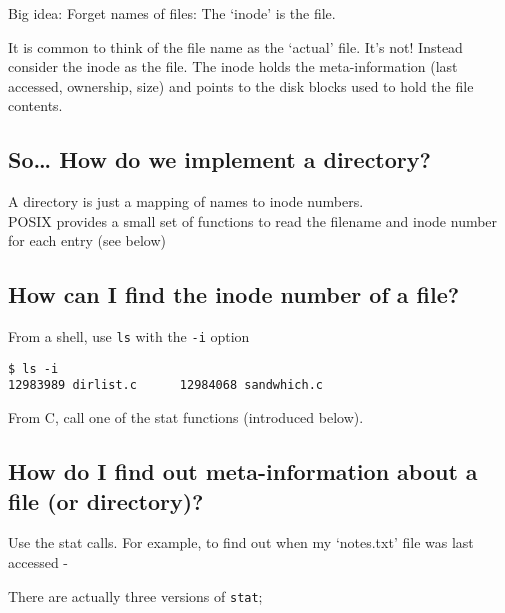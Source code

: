 Big idea: Forget names of files: The `inode' is the file.

It is common to think of the file name as the `actual' file. It's not!
Instead consider the inode as the file. The inode holds the
meta-information (last accessed, ownership, size) and points to the disk
blocks used to hold the file contents.

\subsection{So\ldots{} How do we implement a
directory?}\label{so-how-do-we-implement-a-directory}

A directory is just a mapping of names to inode numbers.\\POSIX provides
a small set of functions to read the filename and inode number for each
entry (see below)

\subsection{How can I find the inode number of a
file?}\label{how-can-i-find-the-inode-number-of-a-file}

From a shell, use \texttt{ls} with the \texttt{-i} option

\begin{verbatim}
$ ls -i
12983989 dirlist.c      12984068 sandwhich.c
\end{verbatim}

From C, call one of the stat functions (introduced below).

\subsection{How do I find out meta-information about a file (or
directory)?}\label{how-do-i-find-out-meta-information-about-a-file-or-directory}

Use the stat calls. For example, to find out when my `notes.txt' file
was last accessed -

\begin{Shaded}
\end{Shaded}

There are actually three versions of \texttt{stat};


